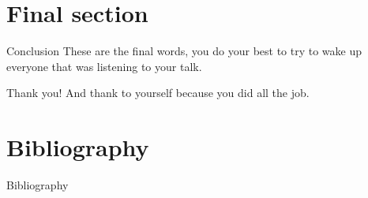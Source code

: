 \documentclass[10pt, xcolor = svgnames]{beamer} %
\begin{document}
\section{Final section}



\begin{frame}{Conclusion}
    These are the final words, you do your best to try to wake up everyone that was listening to your talk.
\end{frame}


{ %
\begin{frame}[standout]
  Thank you! And thank to yourself because you did all the job. 
\end{frame}
}
%

\section{Bibliography}

\begin{frame}[allowframebreaks]{Bibliography}
\nocite{*}


\end{frame}
\end{document}
